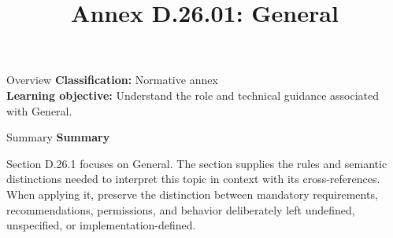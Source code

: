 \documentclass[10pt,letterpaper]{article}
\title{Annex D.26.01: General}
\author{}
\date{}
\begin{document}
\maketitle
\begin{CornellOverviewBox}{Overview}
\textbf{Classification:} Normative annex\\[2pt]
\textbf{Learning objective:} Understand the role and technical guidance associated with General.
\end{CornellOverviewBox}\begin{CornellSummaryBox}{Summary}
{\sffamily\bfseries\color{Accent} Summary}\par\vspace{3pt}Section D.26.1 focuses on General. The section supplies the rules and semantic distinctions needed to interpret this topic in context with its cross-references. When applying it, preserve the distinction between mandatory requirements, recommendations, permissions, and behavior deliberately left undefined, unspecified, or implementation-defined.
\end{CornellSummaryBox}
\end{document}

